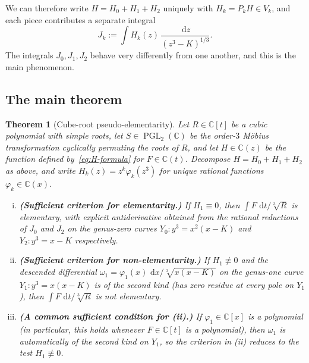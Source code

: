 \documentclass[11pt,a4paper]{article}
\theoremstyle{plain}
\newtheorem{theorem}{Theorem}[section]
\theoremstyle{definition}
\theoremstyle{remark}
\newcommand{\C}{\mathbb{C}}
\newcommand{\PGL}{\operatorname{PGL}}
\renewcommand{\d}{\,\mathrm{d}}
\begin{document}
We can therefore write $H = H_0 + H_1 + H_2$ uniquely with $H_k = P_k H \in V_k$, and each piece contributes a separate integral
\[
  J_k := \int H_k(z)\,\frac{\d z}{(z^3-K)^{1/3}}.
\]
The integrals $J_0,J_1,J_2$ behave very differently from one another, and this is the main phenomenon.

\subsection{The main theorem}

\begin{theorem}[Cube-root pseudo-elementarity]\label{thm:cubic-goursat}
Let $R\in\C[t]$ be a cubic polynomial with simple roots, let $S\in\PGL_2(\C)$ be the order-$3$ M\"obius transformation cyclically permuting the roots of $R$, and let $H\in\C(z)$ be the function defined by~\eqref{eq:H-formula} for $F\in\C(t)$. Decompose $H=H_0+H_1+H_2$ as above, and write $H_k(z)=z^k\varphi_k(z^3)$ for unique rational functions $\varphi_k\in\C(x)$.
\begin{enumerate}[(i)]
  \item \textbf{(Sufficient criterion for elementarity.)} If $H_1\equiv 0$, then $\int F\,\d t/\sqrt[3]{R}$ is elementary, with explicit antiderivative obtained from the rational reductions of $J_0$ and $J_2$ on the genus-zero curves $Y_0\colon y^3=x^2(x-K)$ and $Y_2\colon y^3=x-K$ respectively.
  \item \textbf{(Sufficient criterion for non-elementarity.)} If $H_1\not\equiv 0$ and the descended differential $\omega_1 = \varphi_1(x)\,\d x / \sqrt[3]{x(x-K)}$ on the genus-one curve $Y_1\colon y^3=x(x-K)$ is of the \emph{second kind} (has zero residue at every pole on $Y_1$), then $\int F\,\d t/\sqrt[3]{R}$ is not elementary.
  \item \textbf{(A common sufficient condition for (ii).)} If $\varphi_1\in\C[x]$ is a polynomial (in particular, this holds whenever $F\in\C[t]$ is a polynomial), then $\omega_1$ is automatically of the second kind on $Y_1$, so the criterion in (ii) reduces to the test $H_1\not\equiv 0$.
\end{enumerate}
\end{theorem}
\end{document}
